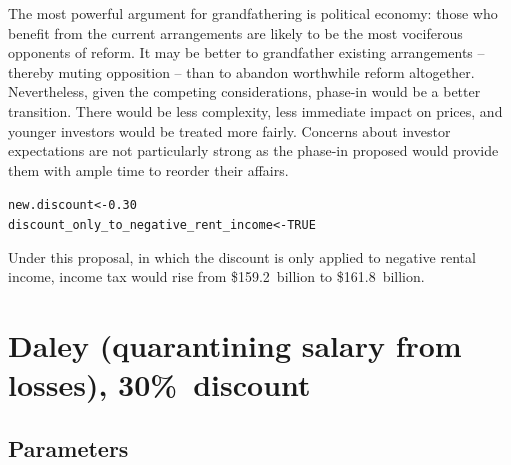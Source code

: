\documentclass{grattan}\usepackage[]{graphicx}\usepackage[]{color}
\makeatletter
\newcommand{\hlnum}[1]{\textcolor[rgb]{0.686,0.059,0.569}{#1}}%
\newcommand{\hlstd}[1]{\textcolor[rgb]{0.345,0.345,0.345}{#1}}%
\newcommand{\hlkwb}[1]{\textcolor[rgb]{0.69,0.353,0.396}{#1}}%
\newenvironment{kframe}{%
 \def\at@end@of@kframe{}%
 \ifinner\ifhmode%
  \def\at@end@of@kframe{\end{minipage}}%
  \begin{minipage}{\columnwidth}%
 \fi\fi%
 \def\FrameCommand##1{\hskip\@totalleftmargin \hskip-\fboxsep
 \colorbox{shadecolor}{##1}\hskip-\fboxsep
     \hskip-\linewidth \hskip-\@totalleftmargin \hskip\columnwidth}%
 \MakeFramed {\advance\hsize-\width
   \@totalleftmargin\z@ \linewidth\hsize
   \@setminipage}}%
 {\par\unskip\endMakeFramed%
 \at@end@of@kframe}
\newenvironment{knitrout}{}{} %
\makeatother
\begin{document}
The most powerful argument for grandfathering is political economy: those who benefit from the current arrangements are likely to be the most vociferous opponents of reform. It may be better to grandfather existing arrangements -- thereby muting opposition -- than to abandon worthwhile reform altogether.  
Nevertheless, given the competing considerations, phase-in would be a better transition. There would be less complexity, less immediate impact on prices, and younger investors would be treated more fairly. Concerns about investor expectations are not particularly strong as the phase-in proposed would provide them with ample time to reorder their affairs.

\onecolumn
\begin{knitrout}
\color{fgcolor}\begin{kframe}
\begin{alltt}
\hlstd{new.discount} \hlkwb{<-} \hlnum{0.30}
\hlstd{discount_only_to_negative_rent_income} \hlkwb{<-} \hlnum{TRUE}
\end{alltt}
\end{kframe}
\end{knitrout}




Under this proposal, in which the discount is only applied to negative rental income, income tax would rise from \$159.2~billion to \$161.8~billion.

\section{Daley (quarantining salary from losses), 30\%\ discount}
\subsection{Parameters}
\end{document}
